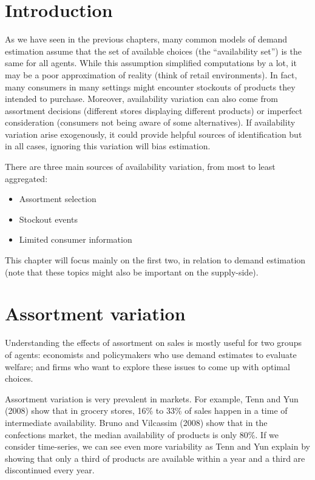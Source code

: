 \section{Introduction}

As we have seen in the previous chapters, many common models of demand estimation assume that the set of available choices (the ``availability set'') is the same for all agents. While this assumption simplified computations by a lot, it may be a poor approximation of reality (think of retail environments). In fact, many consumers in many settings might encounter stockouts of products they intended to purchase. Moreover, availability variation can also come from assortment decisions (different stores displaying different products) or imperfect consideration (consumers not being aware of some alternatives). If availability variation arise exogenously, it could provide helpful sources of identification but in all cases, ignoring this variation will bias estimation.

There are three main sources of availability variation, from most to least aggregated:\begin{itemize}
\item Assortment selection
\item Stockout events
\item Limited consumer information
\end{itemize}
This chapter will focus mainly on the first two, in relation to demand estimation (note that these topics might also be important on the supply-side).

\section{Assortment variation}

Understanding the effects of assortment on sales is mostly useful for two groups of agents: economists and policymakers who use demand estimates to evaluate welfare; and firms who want to explore these issues to come up with optimal choices.

Assortment variation is very prevalent in markets. For example, Tenn and Yun (2008) show that in grocery stores, 16\% to 33\% of sales happen in a time of intermediate availability. Bruno and Vilcassim (2008) show that in the confections market, the median availability of products is only 80\%. If we consider time-series, we can see even more variability as Tenn and Yun explain by showing that only a third of products are available within a year and a third are discontinued every year.

